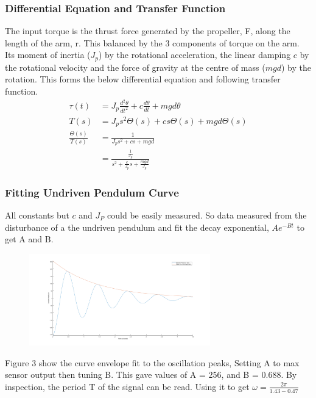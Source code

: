 \documentclass[a4paper,11pt]{article}
\begin{document}
\subsubsection{Differential Equation and Transfer Function}
The input torque is the thrust force generated by the propeller, F, along the length of the arm, r. This balanced by the 3 components of torque on the arm. Its moment of inertia ($J_p$) by the rotational acceleration, the linear damping $c$ by the rotational velocity and the force of gravity at the centre of mass ($mgd$) by the rotation. This forms the below differential equation and following transfer function.
\begin{align*}
\tau(t) &= J_{p}\frac{d^{2}\theta}{dt^{2}} + c\frac{d\theta}{dt} + mgd\theta \\
T(s) &= J_{p}s^{2}\Theta(s) + cs\Theta(s) + mgd\Theta(s) \\
\frac{\Theta(s)}{T(s)} &= \frac{1}{J_{p}s^{2} + cs + mgd} \\
&=  \frac{\frac{1}{J_{p}}}{s^{2} + \frac{c}{J_{p}}s + \frac{mgd}{J_{p}}}
\end{align*}


\subsubsection{Fitting Undriven Pendulum Curve}
All constants but $c$ and $J_P$ could be easily measured. So data measured from the disturbance of a the undriven pendulum and fit the decay exponential, $Ae^{-Bt}$ to get A and B.
\begin{figure}[h]
        \centering
        \includegraphics[width=0.7\textwidth]{inc/fittedcurve.png}
        \caption{}
        \label{}
\end{figure}

Figure 3 show the curve envelope fit to the oscillation peaks, Setting A to max sensor output then tuning B. This gave values of A = 256, and B = 0.688.
By inspection, the period T of the signal can be read. Using it to get $\omega = \frac{2\pi}{1.43-0.47}$
\end{document}
